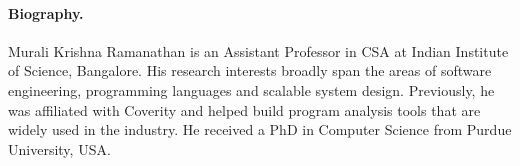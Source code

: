 \documentclass[EPiCempty]{easychair}
\begin{document}
\paragraph{Biography.} Murali Krishna Ramanathan is an Assistant Professor in
CSA at Indian Institute of Science, Bangalore. His research interests broadly
span the areas of software engineering, programming languages and scalable
system design. Previously, he was affiliated with Coverity and helped build
program analysis tools that are widely used in the industry. He received a PhD
in Computer Science from Purdue University, USA. 
\end{document}
